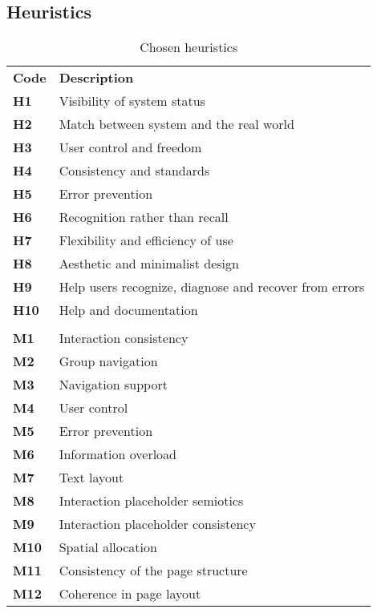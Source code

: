 \subsection{Heuristics}
\begin{table}[htp!]
    \centering
    \begin{tabular}{ |l|l| }
        \hline
        \rowcolor{unicefBlue}
        \multicolumn{2}{ |c| }{\color{white}{\textbf{Nielsen's}}}\\
        \hline
        \textbf{Code} & \textbf{Description}\\
        \hline
        \textbf{H1} & Visibility of system status\\
        \hline
        \textbf{H2} & Match between system and the real world\\
        \hline
        \textbf{H3} & User control and freedom\\
        \hline
        \textbf{H4} & Consistency and standards\\
        \hline
        \textbf{H5} & Error prevention\\
        \hline
        \textbf{H6} & Recognition rather than recall\\
        \hline
        \textbf{H7} & Flexibility and efficiency of use\\
        \hline
        \textbf{H8} & Aesthetic and minimalist design\\
        \hline
        \textbf{H9} & Help users recognize, diagnose and recover from errors\\
        \hline
        \textbf{H10} & Help and documentation\\
        \hline
        \rowcolor{unicefBlue}
        \multicolumn{2}{ |c| }{\color{white}{\textbf{MiLe}}}\\
        \hline
        \textbf{M1} & Interaction consistency\\
        \hline
        \textbf{M2} & Group navigation\\
        \hline
        \textbf{M3} & Navigation support\\
        \hline
        \textbf{M4} & User control\\
        \hline
        \textbf{M5} & Error prevention\\
        \hline
        \textbf{M6} & Information overload\\
        \hline
        \textbf{M7} & Text layout\\
        \hline
        \textbf{M8} & Interaction placeholder semiotics\\
        \hline
        \textbf{M9} & Interaction placeholder consistency\\
        \hline
        \textbf{M10} & Spatial allocation\\
        \hline
        \textbf{M11} & Consistency of the page structure\\
        \hline
        \textbf{M12} & Coherence in page layout\\
        \hline
    \end{tabular}
    \caption{Chosen heuristics}
\end{table}